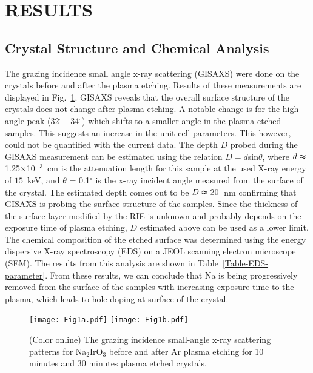 \documentclass[aps,prb,twocolumn]{revtex4-1}
\begin{document}
\section{RESULTS}
\subsection{Crystal Structure and Chemical Analysis}
The  grazing incidence small angle x-ray scattering (GISAXS) were done on the crystals before and after the plasma etching. Results of these measurements are displayed in Fig.~\ref{Fig-1}.  GISAXS reveals that the overall surface structure of the crystals does not change after plasma etching.  A notable change is for the high angle peak (32$^\circ$ - 34$^\circ$) which shifts to a smaller angle in the plasma etched samples.  This suggests an increase in the unit cell parameters.  This however, could not be quantified with the current data. The depth $D$ probed during the GISAXS measurement can be estimated using the relation $D = d$sin$\theta$, where $d \thickapprox $ 1.25$ \times $10$ ^{-3}$~cm is the attenuation length for this sample at the used X-ray energy of $15$~keV, and $ \theta $ = 0.1$^\circ$ is the x-ray incident angle measured from the surface of the crystal.  The estimated depth comes out to be $D \thickapprox 20$~nm confirming that GISAXS is probing the surface structure of the samples. Since the thickness of the surface layer modified by the RIE is unknown and probably depends on the exposure time of plasma etching, $D$ estimated above can be used as a lower limit.  The chemical composition of the etched surface was determined using the energy dispersive X-ray spectroscopy (EDS) on a JEOL scanning electron microscope (SEM). The results from this analysis are shown in Table~\ref{Table-EDS-parameter}. From these results, we can conclude that Na is being progressively removed from the surface of the samples with increasing exposure time to the plasma, which leads to hole doping at surface of the crystal. 

\begin{figure}[t]   
\texttt{[image: Fig1a.pdf]}  
\texttt{[image: Fig1b.pdf]}   
\caption{(Color online) The grazing incidence small-angle x-ray scattering patterns for Na$_{2}$IrO$ _{3} $ before and after  Ar plasma etching for 10 minutes and 30 minutes plasma etched crystals. 
\label{Fig-1}}
\end{figure}
\end{document}
